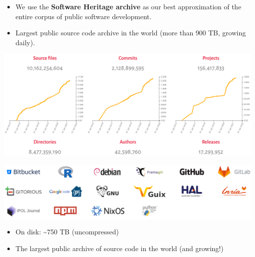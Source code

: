 \documentclass[aspectratio=169,xcolor=table]{beamer}
\begin{document}
\begin{frame}
        \begin{block}{}
            \begin{itemize}
                \item We use the \textbf{Software Heritage archive} as our best
                    approximation of the entire corpus of public software
                    development.
                \item Largest public source code archive in the world (more
                    than 900 TB, growing daily).
            \end{itemize}
        \end{block}
        \begin{center}
            \includegraphics[trim=0 2cm 0 0, clip, width=0.7\linewidth]{img/archive-growth.png}
        \end{center}
        \begin{center}
            \colorbox{white}{\includegraphics[width=0.7\linewidth]{img/archive-coverage.png}}
        \end{center}
        \vspace{-2mm}
        \begin{block}{}
            \begin{itemize}
                \item On disk: \textasciitilde{}750 TB (uncompressed)
                \item The largest public archive of source code in the world
                    (and growing!)
            \end{itemize}
        \end{block}
    \end{frame}
\end{document}
